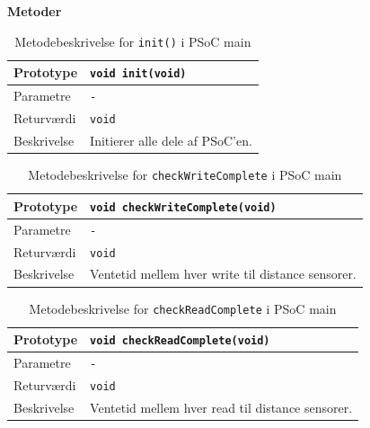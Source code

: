 \clearpage

\textbf{Metoder}

\begin{table}[h]
	\begin{tabularx}{\textwidth}{| L{2.5 cm} | Z |} \hline
	Prototype 	& \texttt{void init(void)} 			\\\hline
	Parametre 	& \texttt{-}  						\\\hline
	Returværdi	& \texttt{void} 					\newline \\\hline
	Beskrivelse	& Initierer alle dele af PSoC'en. 	\newline \\\hline
	\end{tabularx}
	\caption{Metodebeskrivelse for \texttt{init()} i PSoC main}
	\label{table:psoc_init}
\end{table}

\begin{table}[h]
	\begin{tabularx}{\textwidth}{| L{2.5 cm} | Z |} \hline
	Prototype 	& \texttt{void checkWriteComplete(void)} \\\hline
	Parametre 	& \texttt{-}  \\\hline
	Returværdi	& \texttt{void} 			\newline \\\hline
	Beskrivelse	& Ventetid mellem hver write til distance sensorer. \newline \\\hline
	\end{tabularx}
	\caption{Metodebeskrivelse for \texttt{checkWriteComplete} i PSoC main}
	\label{table:psoc_writecomplete}
\end{table}

\begin{table}[h]
	\begin{tabularx}{\textwidth}{| L{2.5 cm} | Z |} \hline
	Prototype 	& \texttt{void checkReadComplete(void)} \\\hline
	Parametre 	& \texttt{-}  \\\hline
	Returværdi	& \texttt{void} 			\newline \\\hline
	Beskrivelse	& Ventetid mellem hver read til distance sensorer. \newline \\\hline	
	\end{tabularx}
	\caption{Metodebeskrivelse for \texttt{checkReadComplete} i PSoC main}
	\label{table:psoc_readcomplete}
\end{table}

